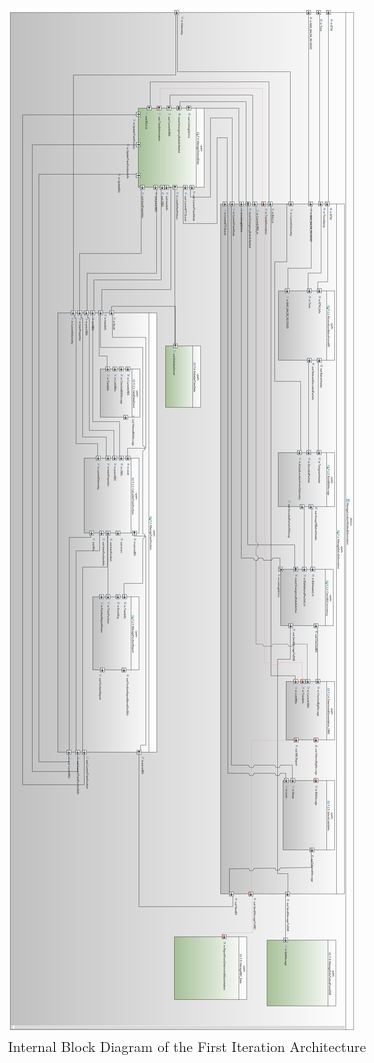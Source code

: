 \documentclass{template/openetcs_report}
\begin{document}
\begin{figure}[p]
\centering
\includegraphics[scale=0.2]{../images/ManageLocationInformationIBD.png}
\caption{Internal Block Diagram of the First Iteration Architecture}
\end{figure}
\end{document}

